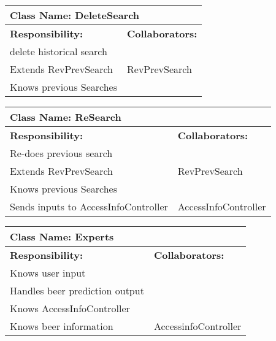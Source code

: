 \documentclass[]{article}
\begin{document}
\begin{table}[ht]
		\centering
		\begin{tabular}{|p{5cm}|p{5cm}|}
			\hline 
			\multicolumn{2}{|l|}{\textbf{Class Name: DeleteSearch}} \\
			\hline
			\textbf{Responsibility:} & \textbf{Collaborators:} \\
			\hline
			delete historical search  & \\
			\hline
			Extends RevPrevSearch & RevPrevSearch\\
			\hline
			Knows previous Searches & \\
			\hline
		\end{tabular}
	\end{table}	


	
\begin{table}[ht]
		\centering
		\begin{tabular}{|p{5cm}|p{5cm}|}
			\hline 
			\multicolumn{2}{|l|}{\textbf{Class Name: ReSearch}} \\
			\hline
			\textbf{Responsibility:} & \textbf{Collaborators:} \\
			\hline
			Re-does previous search & \\
			\hline
			Extends RevPrevSearch & RevPrevSearch\\
			\hline
			Knows previous Searches & \\
			\hline
			Sends inputs to AccessInfoController & AccessInfoController\\
			\hline
		\end{tabular}
	\end{table}	

	\begin{table}[ht]
		\centering
		\begin{tabular}{|p{5cm}|p{5cm}|}
		\hline 
		 \multicolumn{2}{|l|}{\textbf{Class Name: Experts}} \\
		\hline
		\textbf{Responsibility:} & \textbf{Collaborators:} \\
		\hline
		Knows user input  & \\
		\hline
		Handles beer prediction output & \\
		\hline
		Knows AccessInfoController & \\
		\hline
		Knows beer information & AccessinfoController\\
		\hline
		
		\end{tabular}
	\end{table}
	
\end{document}
